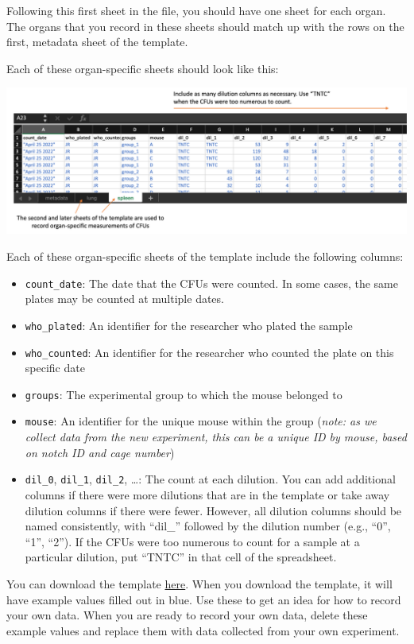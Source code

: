 \documentclass[
]{book}
\providecommand{\tightlist}{%
  \setlength{\itemsep}{0pt}\setlength{\parskip}{0pt}}
\begin{document}
Following this first sheet in the file, you should have one sheet for each
organ. The organs that you record in these sheets should match up with the rows
on the first, metadata sheet of the template.

Each of these organ-specific sheets should look like this:

\includegraphics[width=1\linewidth]{figures/cfu_organ_sheet_example}

Each of these organ-specific sheets of the template include the following columns:

\begin{itemize}
\tightlist
\item
  \texttt{count\_date}: The date that the CFUs were counted. In some cases, the same plates
  may be counted at multiple dates.
\item
  \texttt{who\_plated}: An identifier for the researcher who plated the sample
\item
  \texttt{who\_counted}: An identifier for the researcher who counted the plate on this
  specific date
\item
  \texttt{groups}: The experimental group to which the mouse belonged to
\item
  \texttt{mouse}: An identifier for the unique mouse within the group (\emph{note: as we
  collect data from the new experiment, this can be a unique ID by mouse, based on
  notch ID and cage number})
\item
  \texttt{dil\_0}, \texttt{dil\_1}, \texttt{dil\_2}, \ldots: The count at each dilution. You can add additional
  columns if there were more dilutions that are in the template or take away
  dilution columns if there were fewer. However, all dilution columns should be
  named consistently, with ``dil\_'' followed by the dilution number (e.g., ``0'', ``1'',
  ``2''). If the CFUs were too numerous to count for a sample at a particular
  dilution, put ``TNTC'' in that cell of the spreadsheet.
\end{itemize}

You can download the template \href{https://github.com/csu-impactb/CODING-TEAM-BOOKDOWN-/raw/main/templates/data_collection_templates/cfu_collection_template.xlsx}{here}.
When you download the template, it will have example values filled out in blue.
Use these to get an idea for how to record your own data. When you are ready
to record your own data, delete these example values and replace them with
data collected from your own experiment.
\end{document}
